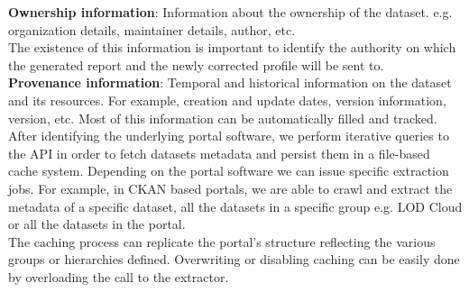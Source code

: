 \documentclass[runningheads,a4paper]{llncs}
\begin{document}
\textbf{Ownership information}: Information about the ownership of the dataset. e.g. organization details, maintainer details, author, etc.\\ The existence of this information is important to identify the authority on which the generated report and the newly corrected profile will be sent to.\\

\textbf{Provenance information}: Temporal and historical information on the dataset and its resources. For example, creation and update dates, version information, version, etc. Most of this information can be automatically filled and tracked.\\

After identifying the underlying portal software, we perform iterative queries to the API in order to fetch datasets metadata and persist them in a file-based cache system.
Depending on the portal software we can issue specific extraction jobs. For example, in CKAN based portals, we are able to crawl and extract the metadata of a specific dataset, all the datasets in a specific group e.g. LOD Cloud or all the datasets in the portal.\\The caching process can replicate the portal's structure reflecting the various groups or hierarchies defined. Overwriting or disabling caching can be easily done by overloading the call to the extractor.



\end{document}
